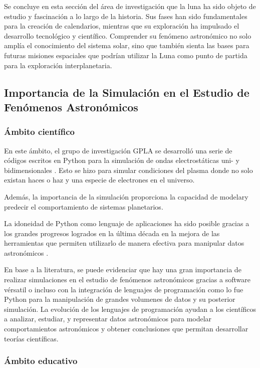 Se concluye en esta sección del área de investigación que la luna ha sido objeto de estudio y fascinación a lo largo de la historia. Sus fases han sido fundamentales para la creación de calendarios, mientras que su exploración ha impulsado el desarrollo tecnológico y científico. Comprender su fenómeno astronómico no solo amplía el conocimiento del sistema solar, sino que también sienta las bases para futuras misiones espaciales que podrían utilizar la Luna como punto de partida para la exploración interplanetaria.


\subsection{Importancia de la Simulación en el Estudio de Fenómenos Astronómicos}

\subsubsection{Ámbito científico}


En este ámbito, el grupo de investigación GPLA se desarrolló una serie de códigos escritos en
Python para la simulación de ondas electrostáticas uni- y bidimensionales \cite{ondas}. Esto se hizo para simular condiciones del plasma donde
no solo existan haces o haz y una especie de electrones en el universo.

Además, la importancia de la simulación proporciona la capacidad de modelary predecir el comportamiento de sistemas planetarios\cite{perryman}.

La idoneidad de Python como lenguaje de aplicaciones ha sido posible gracias a los grandes
progresos logrados en la última década en la mejora de las herramientas que permiten utilizarlo
de manera efectiva para manipular datos astronómicos \cite{green}.

En base a la literatura, se puede evidenciar que hay una gran importancia de realizar simulaciones en el estudio de fenómenos astronómicos
gracias a software vérsatil o incluso con la integración de lenguajes de programación como lo fue Python para la manipulación de grandes volumenes
de datos y su posterior simulación. La evolución de los lenguajes de programación ayudan a los científicos a analizar, estudiar, y representar datos astronómicos 
para modelar comportamientos astronómicos y obtener conclusiones que permitan desarrollar teorías científicas.



\subsubsection{Ámbito educativo}

